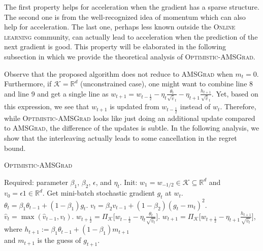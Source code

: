 \documentclass[11pt]{article}
\def\K{\mathcal{K}}
\theoremstyle{k}
\begin{document}
The first property helps for acceleration when the gradient has a sparse structure.
The second one is from the well-recognized idea of momentum which can also help for acceleration. The last one, perhaps less known outside the \textsc{Online learning} community, can actually lead to acceleration when the prediction of the next gradient is good. This property will be elaborated in the following subsection in which we provide the theoretical analysis of \textsc{Optimistic-AMSGrad}.


Observe that the proposed algorithm does not reduce to \textsc{AMSGrad} when $m_{t}=0$.
Furthermore, if $\K = \mathbb R^{d}$ (unconstrained case),
one might want to combine line 8 and line 9 and get a single line as $w_{t+1}= w_{t-\frac{1}{2}} - \eta_t \frac{\theta_t}{ \sqrt{\hat{v}}_t } - \eta_{t+1} \frac{h_{t+1}}{ \sqrt{\hat{v}}_t }$. 
Yet, based on this expression, we see that $w_{t+1}$ is updated from $w_{t-\frac{1}{2}}$ instead of $w_t$. 
Therefore, while \textsc{Optimistic-AMSGrad} looks like just doing an additional update compared to \textsc{AMSGrad}, the difference of the updates is subtle. 
In the following analysis, we show that the interleaving actually leads to some cancellation in the regret bound.

\begin{algorithm}[t]
\begin{algorithmic}[1] 
\small
\caption{\textsc{Optimistic-AMSGrad}} \label{optadam}
\STATE Required: parameter $\beta_1$, $\beta_2$, $\epsilon$, and $\eta_t$. 
\STATE Init: $w_1 = w_{-1/2} \in \K \subseteq \mathbb R^d $ and $v_{0} = \epsilon 1 \in \mathbb R^{d}$.
\STATE Get mini-batch stochastic gradient $g_t$ at $w_t$.
\STATE $\theta_t = \beta_{1} \theta_{t-1} + (1 - \beta_{1}) g_t$.
\STATE $v_t = \beta_2 v_{t-1} + (1 - \beta_2) (g_t - m_{t})^{2}$.
\STATE $\hat{v}_t = \max( \hat{v}_{t-1} , v_t )$. 
\STATE $w_{t+\frac{1}{2}} = \Pi_{\K}\big[ w_{t-\frac{1}{2}} - \eta_t \frac{\theta_t}{ \sqrt{\hat{v}_t }  } \big]$.
\STATE $w_{t+1} = \Pi_{\K}\big[ w_{t+\frac{1}{2}} - \eta_{t+1} \frac{h_{t+1}}{ \sqrt{\hat{v}_t } } \big]$, %
 \\  
where $h_{t+1}:= \beta_{1} \theta_{t-1} + (1 - \beta_{1}) m_{t+1}$
\\ \qquad and 
$m_{t+1}$ is the guess of $g_{t+1}$. 
\ENDFOR 
\end{algorithmic}
\end{algorithm}
\end{document}
